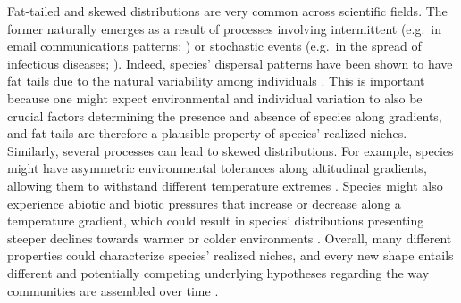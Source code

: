 \documentclass[11pt, a4paper]{article}
\begin{document}


Fat-tailed and skewed distributions are very common across scientific fields. The former naturally emerges as a result of processes involving intermittent (e.g.~in email communications patterns; \citealt{malmgrenPoissonianExplanationHeavy2008}) or stochastic events (e.g.~in the spread of infectious diseases; \citealt{wongEvidenceThatCoronavirus2020}). Indeed, species' dispersal patterns have been shown to have fat tails due to the natural variability among individuals \citep{petrovskiiDispersalStatisticallyStructured2009}. This is important because one might expect environmental and individual variation to also be crucial factors determining the presence and absence of species along gradients, and fat tails are therefore a plausible property of species' realized niches. Similarly, several processes can lead to skewed distributions. For example, species might have asymmetric environmental tolerances along altitudinal gradients, allowing them to withstand different temperature extremes \citep{sundayGlobalAnalysisThermal2011}. Species might also experience abiotic and biotic pressures that increase or decrease along a temperature gradient, which could result in species' distributions presenting steeper declines towards warmer or colder environments \citep{normandImportanceAbioticStress2009}. Overall, many different properties could characterize species' realized niches, and every new shape entails different and potentially competing underlying hypotheses regarding the way communities are assembled over time \citep{damenSpatialPredictionsCommunity2017}.
\end{document}
